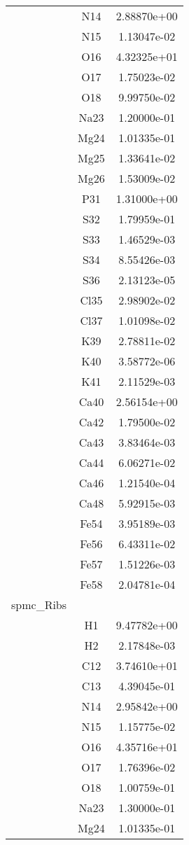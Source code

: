 \begin{centering}
\begin{longtable}{l c c}
& N14 & 2.88870e+00 \\ 
& N15 & 1.13047e-02 \\ 
& O16 & 4.32325e+01 \\ 
& O17 & 1.75023e-02 \\ 
& O18 & 9.99750e-02 \\ 
& Na23 & 1.20000e-01 \\ 
& Mg24 & 1.01335e-01 \\ 
& Mg25 & 1.33641e-02 \\ 
& Mg26 & 1.53009e-02 \\ 
& P31 & 1.31000e+00 \\ 
& S32 & 1.79959e-01 \\ 
& S33 & 1.46529e-03 \\ 
& S34 & 8.55426e-03 \\ 
& S36 & 2.13123e-05 \\ 
& Cl35 & 2.98902e-02 \\ 
& Cl37 & 1.01098e-02 \\ 
& K39 & 2.78811e-02 \\ 
& K40 & 3.58772e-06 \\ 
& K41 & 2.11529e-03 \\ 
& Ca40 & 2.56154e+00 \\ 
& Ca42 & 1.79500e-02 \\ 
& Ca43 & 3.83464e-03 \\ 
& Ca44 & 6.06271e-02 \\ 
& Ca46 & 1.21540e-04 \\ 
& Ca48 & 5.92915e-03 \\ 
& Fe54 & 3.95189e-03 \\ 
& Fe56 & 6.43311e-02 \\ 
& Fe57 & 1.51226e-03 \\ 
& Fe58 & 2.04781e-04 \\ 
\hline
spmc_Ribs & & \\
\hline
& H1 & 9.47782e+00 \\ 
& H2 & 2.17848e-03 \\ 
& C12 & 3.74610e+01 \\ 
& C13 & 4.39045e-01 \\ 
& N14 & 2.95842e+00 \\ 
& N15 & 1.15775e-02 \\ 
& O16 & 4.35716e+01 \\ 
& O17 & 1.76396e-02 \\ 
& O18 & 1.00759e-01 \\ 
& Na23 & 1.30000e-01 \\ 
& Mg24 & 1.01335e-01 \\ 

\end{longtable}
\end{centering}
